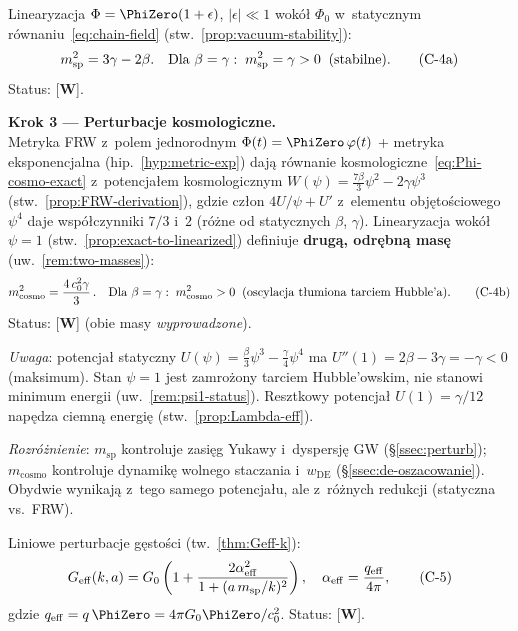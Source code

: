 Linearyzacja $\Phi = \PhiZero(1 + \epsilon)$, $|\epsilon| \ll 1$
wok\'o\l{} $\Phi_0$ w~statycznym r\'ownaniu~\eqref{eq:chain-field}
(stw.~\ref{prop:vacuum-stability}):
\begin{equation}\label{eq:chain-msp}
  m_{\mathrm{sp}}^2 = 3\gamma - 2\beta.
  \quad\text{Dla }\beta = \gamma:\;
  m_{\mathrm{sp}}^2 = \gamma > 0\;\;(\text{stabilne}).
  \tag{$\mathrm{C}$-4a}
\end{equation}
Status: [\textbf{W}].

\bigskip
\noindent\textbf{Krok 3 --- Perturbacje kosmologiczne.}\\[2pt]
Metryka FRW z~polem jednorodnym $\Phi(t) = \PhiZero\,\varphi(t)$
+ metryka eksponencjalna (hip.~\ref{hyp:metric-exp}) daj\k{a}
r\'ownanie kosmologiczne~\eqref{eq:Phi-cosmo-exact}
z~potencja\l{}em kosmologicznym $W(\psi) = \frac{7\beta}{3}\psi^2 - 2\gamma\psi^3$
(stw.~\ref{prop:FRW-derivation}), gdzie cz\l{}on $4U/\psi + U'$
z~elementu obj\k{e}to\'sciowego $\psi^4$ daje wsp\'o\l{}czynniki
$7/3$ i~$2$ (r\'o\.zne od statycznych $\beta$, $\gamma$).
Linearyzacja wok\'o\l{} $\psi = 1$
(stw.~\ref{prop:exact-to-linearized}) definiuje
\textbf{drug\k{a}, odr\k{e}bn\k{a} mas\k{e}}
(uw.~\ref{rem:two-masses}):
\begin{equation}\label{eq:chain-mcosmo}
  m_{\mathrm{cosmo}}^2 = \frac{4\,c_0^2\gamma}{3}\,.
  \quad\text{Dla }\beta = \gamma:\;
  m_{\mathrm{cosmo}}^2 > 0
  \;\;(\text{oscylacja t\l{}umiona tarciem Hubble'a}).
  \tag{$\mathrm{C}$-4b}
\end{equation}
Status: [\textbf{W}] (obie masy \emph{wyprowadzone}).

\smallskip
\noindent\emph{Uwaga}: potencja\l{} statyczny $U(\psi) = \frac{\beta}{3}\psi^3 - \frac{\gamma}{4}\psi^4$
ma $U''(1) = 2\beta - 3\gamma = -\gamma < 0$ (maksimum). Stan $\psi = 1$
jest zamro\.zony tarciem Hubble'owskim, nie stanowi minimum energii
(uw.~\ref{rem:psi1-status}). Resztkowy potencja\l{} $U(1) = \gamma/12$
nap\k{e}dza ciemn\k{a} energi\k{e} (stw.~\ref{prop:Lambda-eff}).

\smallskip
\noindent\emph{Rozr\'o\.znienie}:
$m_{\mathrm{sp}}$ kontroluje zasi\k{e}g Yukawy i~dyspersj\k{e} GW
(\S\ref{ssec:perturb}); $m_{\mathrm{cosmo}}$ kontroluje dynamik\k{e}
wolnego staczania i~$w_{\mathrm{DE}}$ (\S\ref{ssec:de-oszacowanie}).
Obydwie wynikaj\k{a} z~tego samego potencja\l{}u, ale
z~r\'o\.znych redukcji (statyczna vs.\ FRW).

Liniowe perturbacje g\k{e}sto\'sci (tw.~\ref{thm:Geff-k}):
\begin{equation}\label{eq:chain-Geff}
  G_{\mathrm{eff}}(k,a) = G_0
  \left(1 + \frac{2\alpha_{\mathrm{eff}}^2}
  {1 + (a\,m_{\mathrm{sp}}/k)^2}\right),
  \quad \alpha_{\mathrm{eff}} = \frac{q_{\mathrm{eff}}}{4\pi},
  \tag{$\mathrm{C}$-5}
\end{equation}
gdzie $q_{\mathrm{eff}} = q\,\PhiZero = 4\pi G_0\PhiZero/c_0^2$.
Status: [\textbf{W}].

